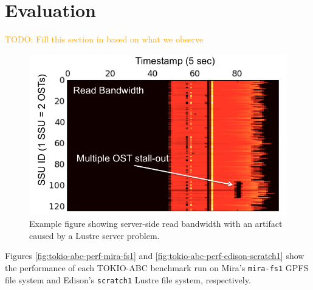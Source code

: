 \documentclass[conference,10pt,compsocconf]{IEEEtran}
\newcommand{\todo}[1]{\textcolor{Orange}{TODO: #1}}
\begin{document}
\section{Evaluation}

\todo{Fill this section in based on what we observe}

\begin{figure}[t]
\centering
\includegraphics[width=0.8\columnwidth]{figs/example.png}
\caption{Example figure showing server-side read bandwidth with an artifact
caused by a Lustre server problem.}
\label{fig:example}
\vspace{-.1in}
\end{figure}

Figures \ref{fig:tokio-abc-perf-mira-fs1} and \ref{fig:tokio-abc-perf-edison-scratch1}
show the performance of each TOKIO-ABC benchmark run on Mira's \texttt{mira-fs1} GPFS
file system and Edison's \texttt{scratch1} Lustre file system, respectively. 
\end{document}
